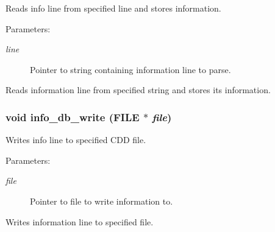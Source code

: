 Reads info line from specified line and stores information.

\begin{Desc}
\item[Parameters:]
\begin{description}
\item[{\em line}]Pointer to string containing information line to parse.\end{description}
\end{Desc}
Reads information line from specified string and stores its information. 
\subsubsection{\setlength{\rightskip}{0pt plus 5cm}void info\_\-db\_\-write (FILE $\ast$ {\em file})}\label{info_8h_a0}


Writes info line to specified CDD file.

\begin{Desc}
\item[Parameters:]
\begin{description}
\item[{\em file}]Pointer to file to write information to.\end{description}
\end{Desc}
Writes information line to specified file. 